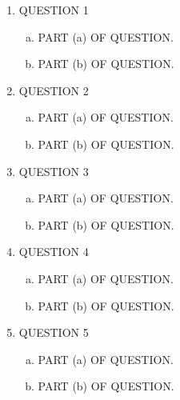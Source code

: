 \documentclass[11pt]{article}
\begin{document}
\begin{enumerate}
	\item QUESTION 1
		\begin{enumerate}[(a)]
			\item PART (a) OF QUESTION.
			\item PART (b) OF QUESTION.
		\end{enumerate}
	
	\item QUESTION 2
		\begin{enumerate}[(a)]
			\item PART (a) OF QUESTION.
			\item PART (b) OF QUESTION.
		\end{enumerate}
	
	\item QUESTION 3
		\begin{enumerate}[(a)]
			\item PART (a) OF QUESTION.
			\item PART (b) OF QUESTION.
		\end{enumerate}
	
	\item QUESTION 4
		\begin{enumerate}[(a)]
			\item PART (a) OF QUESTION.
			\item PART (b) OF QUESTION.
		\end{enumerate}
	
	\item QUESTION 5
		\begin{enumerate}[(a)]
			\item PART (a) OF QUESTION.
			\item PART (b) OF QUESTION.
		\end{enumerate}
\end{enumerate}
\end{document}
